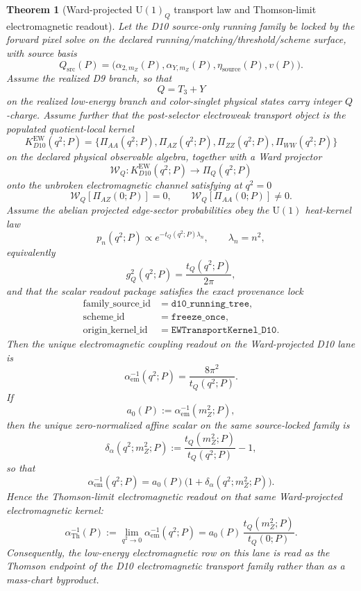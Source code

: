 \documentclass[11pt]{article}
\newtheorem{theorem}{Theorem}[section]
\newcommand{\U}{\mathrm{U}}
\begin{document}
\begin{theorem}[Ward-projected \texorpdfstring{\(\U(1)_Q\)}{U(1)_Q} transport law and Thomson-limit electromagnetic readout]\label{thm:ward_u1q_transport}
Let the D10 source-only running family be locked by the forward pixel solve on the declared
running/matching/threshold/scheme surface, with source basis
\[
Q_{\mathrm{src}}(P)=
\bigl(\alpha_{2,m_Z}(P),\alpha_{Y,m_Z}(P),\eta_{\mathrm{source}}(P),v(P)\bigr).
\]
Assume the realized D9 branch, so that
\[
Q=T_3+Y
\]
on the realized low-energy branch and color-singlet physical states carry integer \(Q\)-charge.
Assume further that the post-selector electroweak transport object is the populated quotient-local
kernel
\[
K^{\mathrm{EW}}_{D10}(q^2;P)
=
\bigl\{\Pi_{AA}(q^2;P),\Pi_{AZ}(q^2;P),\Pi_{ZZ}(q^2;P),\Pi_{WW}(q^2;P)\bigr\}
\]
on the declared physical observable algebra, together with a Ward projector
\[
\mathcal W_Q:
K^{\mathrm{EW}}_{D10}(q^2;P)\longrightarrow \Pi_Q(q^2;P)
\]
onto the unbroken electromagnetic channel satisfying at \(q^2=0\)
\[
\mathcal W_Q[\Pi_{AZ}(0;P)]=0,
\qquad
\mathcal W_Q[\Pi_{AA}(0;P)]\neq 0.
\]
Assume the abelian projected edge-sector probabilities obey the \(\U(1)\) heat-kernel law
\[
p_n(q^2;P)\propto e^{-t_Q(q^2;P)\lambda_n},
\qquad
\lambda_n=n^2,
\]
equivalently
\[
g_Q^2(q^2;P)=\frac{t_Q(q^2;P)}{2\pi},
\]
and that the scalar readout package satisfies the exact provenance lock
\[
\begin{aligned}
\text{family\_source\_id} &= \texttt{d10\_running\_tree},\\
\text{scheme\_id} &= \texttt{freeze\_once},\\
\text{origin\_kernel\_id} &= \texttt{EWTransportKernel\_D10}.
\end{aligned}
\]
Then the unique electromagnetic coupling readout on the Ward-projected D10 lane is
\[
\alpha_{\mathrm{em}}^{-1}(q^2;P)=\frac{8\pi^2}{t_Q(q^2;P)}.
\]
If
\[
a_0(P):=\alpha_{\mathrm{em}}^{-1}(m_Z^2;P),
\]
then the unique zero-normalized affine scalar on the same source-locked family is
\[
\delta_\alpha(q^2;m_Z^2;P)
:=
\frac{t_Q(m_Z^2;P)}{t_Q(q^2;P)}-1,
\]
so that
\[
\alpha_{\mathrm{em}}^{-1}(q^2;P)
=
a_0(P)\bigl(1+\delta_\alpha(q^2;m_Z^2;P)\bigr).
\]
Hence the Thomson-limit electromagnetic readout on that same
Ward-projected electromagnetic kernel:
\[
\alpha_{\mathrm{Th}}^{-1}(P)
:=
\lim_{q^2\to0}\alpha_{\mathrm{em}}^{-1}(q^2;P)
=
a_0(P)\,\frac{t_Q(m_Z^2;P)}{t_Q(0;P)}.
\]
Consequently, the low-energy electromagnetic row on this lane is read as the Thomson endpoint of
the D10 electromagnetic transport family rather than as a mass-chart byproduct.
\end{theorem}
\end{document}

